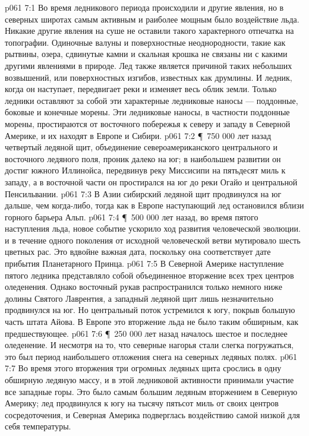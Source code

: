 \vs p061 7:1 Во время ледникового периода происходили и другие явления, но в северных широтах самым активным и раиболее мощным было воздействие льда. Никакие другие явления на суше не оставили такого характерного отпечатка на топографии. Одиночные валуны и поверхностные неоднородности, такие как рытвины, озера, сдвинутые камни и скальная крошка не связаны ни с какими другими явлениями в природе. Лед также является причиной таких небольших возвышений, или поверхностных изгибов, известных как друмлины. И ледник, когда он наступает, передвигает реки и изменяет весь облик земли. Только ледники оставляют за собой эти характерные ледниковые наносы --- поддонные, боковые и конечные морены. Эти ледниковые наносы, в частности поддонные морены, простираются от восточного побережья к северу и западу в Северной Америке, и их находят в Европе и Сибири.
\vs p061 7:2 \P\ 750 000 лет назад четвертый ледяной щит, объединение североамериканского центрального и восточного ледяного поля, проник далеко на юг; в наибольшем развитии он достиг южного Иллинойса, передвинув реку Миссисипи на пятьдесят миль к западу, а в восточной части он простирался на юг до реки Огайо и центральной Пенсильвании.
\vs p061 7:3 В Азии сибирский ледяной щит продвинулся на юг дальше, чем когда\hyp{}либо, тогда как в Европе наступающий лед остановился вблизи горного барьера Альп.
\vs p061 7:4 \P\ 500 000 лет назад, во время пятого наступления льда, новое событие ускорило ход развития человеческой эволюции.  и в течение одного поколения от исходной человеческой ветви мутировало шесть цветных рас. Это вдвойне важная дата, поскольку она соответствует дате прибытия Планетарного Принца.
\vs p061 7:5 В Северной Америке наступление пятого ледника представляло собой объединенное вторжение всех трех центров оледенения. Однако восточный рукав распространился только немного ниже долины Святого Лаврентия, а западный ледяной щит лишь незначительно продвинулся на юг. Но центральный поток устремился к югу, покрыв большую часть штата Айова. В Европе это вторжение льда не было таким обширным, как предшествующее.
\vs p061 7:6 \P\ 250 000 лет назад началось шестое и последнее оледенение. И несмотря на то, что северные нагорья стали слегка погружаться, это был период наибольшего отложения снега на северных ледяных полях.
\vs p061 7:7 Во время этого вторжения три огромных ледяных щита срослись в одну обширную ледяную массу, и в этой ледниковой активности принимали участие все западные горы. Это было самым большим ледяным вторжением в Северную Америку; лед продвинулся к югу на тысячу пятьсот миль от своих центров сосредоточения, и Северная Америка подверглась воздействию самой низкой для себя температуры.
